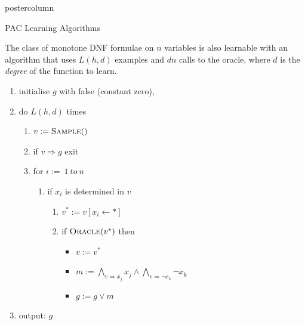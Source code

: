 \documentclass[final,hyperref={pdfpagelabels=false},xcolor=dvipsnames]{beamer}
\begin{document}
\begin{frame}
\begin{columns}
\begin{column}{.49\textwidth}
\begin{beamercolorbox}[center,wd=\textwidth]{postercolumn}
\begin{minipage}[T]{.95\textwidth}
{\begin{block}{PAC Learning Algorithms}
\begin{theorem}\label{thm:mdnf}
    The class of monotone DNF formulae on $n$ variables is also learnable with an
    algorithm that uses $L(h,d)$ examples and $d n$ calls to the oracle,
    where $d$ is the \emph{degree} of the function to learn.
\end{theorem}

\begin{algorithm}
\begin{enumerate}
\item initialise $g$ with false (constant zero),
\item
do $L(h,d)$ times 
\begin{enumerate}
\item $v:=\textsc{Sample}()$
	\item 
	if $v\Rightarrow g$ exit
\item for $i:=\ 1\ to \ n$
\begin{enumerate}
\item if $x_i$ is determined in $v$
\begin{enumerate}
\item $v^*:=v[x_i\leftarrow *]$
\item if $\textsc{Oracle}(v^*)$ then 
\begin{itemize}
\item $v:=v^*$
\item $m:=\bigwedge_{v\Rightarrow x_j} x_j\wedge\bigwedge_{v\Rightarrow\neg x_k}\neg x_k$ 
\item $g:=g\vee m$
\end{itemize}
\end{enumerate}
\end{enumerate}
\end{enumerate}
\item output: $g$
\end{enumerate}
\caption{PAC-learning of monotone DNF formulae.\label{algDNF}}
\end{algorithm}

            \end{block}
            \vfill
          }
        \end{minipage}
      \end{beamercolorbox}
    \end{column}
    

\end{columns}
\end{frame}
\end{document}

